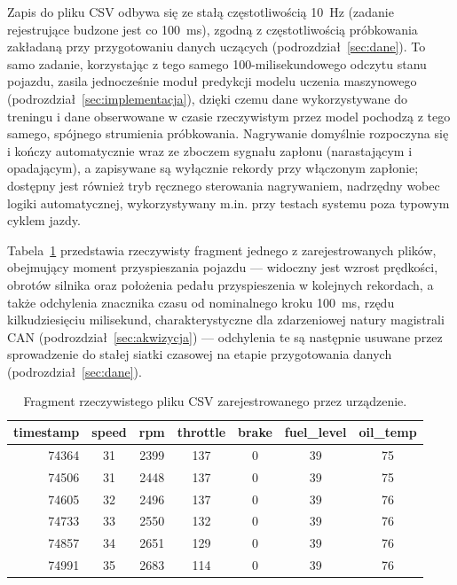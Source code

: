 Zapis do pliku CSV odbywa się ze stałą częstotliwością 10~Hz (zadanie
rejestrujące budzone jest co 100~ms), zgodną z częstotliwością próbkowania
zakładaną przy przygotowaniu danych uczących
(podrozdział~\ref{sec:dane}). To samo zadanie, korzystając z tego samego
100-milisekundowego odczytu stanu pojazdu, zasila jednocześnie moduł predykcji
modelu uczenia maszynowego (podrozdział~\ref{sec:implementacja}), dzięki czemu
dane wykorzystywane do treningu i dane obserwowane w czasie rzeczywistym przez
model pochodzą z tego samego, spójnego strumienia próbkowania. Nagrywanie
domyślnie rozpoczyna się i kończy automatycznie wraz ze zboczem sygnału
zapłonu (narastającym i opadającym), a zapisywane są wyłącznie rekordy przy
włączonym zapłonie; dostępny jest również tryb ręcznego sterowania
nagrywaniem, nadrzędny wobec logiki automatycznej, wykorzystywany m.in. przy
testach systemu poza typowym cyklem jazdy.

Tabela~\ref{tab:przyklad-csv} przedstawia rzeczywisty fragment jednego
z zarejestrowanych plików, obejmujący moment przyspieszania pojazdu ---
widoczny jest wzrost prędkości, obrotów silnika oraz położenia pedału
przyspieszenia w kolejnych rekordach, a także odchylenia znacznika czasu
od nominalnego kroku 100~ms, rzędu kilkudziesięciu milisekund,
charakterystyczne dla
zdarzeniowej natury magistrali CAN (podrozdział~\ref{sec:akwizycja}) ---
odchylenia te są następnie usuwane przez sprowadzenie do stałej siatki
czasowej na etapie przygotowania danych (podrozdział~\ref{sec:dane}).

\begin{table}[!h]
    \centering
    \caption{Fragment rzeczywistego pliku CSV zarejestrowanego przez urządzenie.}
    \label{tab:przyklad-csv}
    \begin{tabular}{| r | c | c | c | c | c | c |} \hline
        \textbf{timestamp} & \textbf{speed} & \textbf{rpm} & \textbf{throttle} & \textbf{brake} & \textbf{fuel\_level} & \textbf{oil\_temp} \\ \hline\hline
        74364 & 31 & 2399 & 137 & 0 & 39 & 75 \\ \hline
        74506 & 31 & 2448 & 137 & 0 & 39 & 75 \\ \hline
        74605 & 32 & 2496 & 137 & 0 & 39 & 76 \\ \hline
        74733 & 33 & 2550 & 132 & 0 & 39 & 76 \\ \hline
        74857 & 34 & 2651 & 129 & 0 & 39 & 76 \\ \hline
        74991 & 35 & 2683 & 114 & 0 & 39 & 76 \\ \hline
    \end{tabular}
\end{table}

